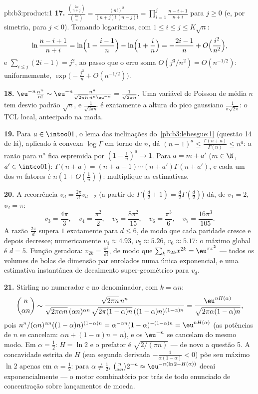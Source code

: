 \begin{solution}{pb:b3:product:1}
\textbf{17.} $\frac{\binom{2n}{n+j}}{\binom{2n}n} =
\frac{(n!)^2}{(n+j)!\,(n-j)!} =
\prod_{i=1}^{j}\frac{n-i+1}{n+i}$ para $j \geq 0$ (e, por
simetria, para $j < 0$). Tomando logaritmos, com $1 \leq i
\leq j \leq K\sqrt n$:
\[
\ln\frac{n-i+1}{n+i} = \ln\Bigl(1 - \frac{i-1}n\Bigr) -
\ln\Bigl(1 + \frac in\Bigr) = -\frac{2i-1}{n} +
O\Bigl(\frac{i^2}{n^2}\Bigr),
\]
e $\sum_{i\leq j}(2i - 1) = j^2$, ao passo que o erro soma
$O(j^3/n^2) = O(n^{-1/2})$: uniformemente,
$\exp\bigl(-\frac{j^2}n + O(n^{-1/2})\bigr)$.

\textbf{18.} $\eu^{-n}\frac{n^n}{n!} \sim \eu^{-n}
\frac{n^n}{\sqrt{2\pi n}\,n^n\eu^{-n}} =
\frac1{\sqrt{2\pi n}}$. Uma variável de Poisson de média $n$ tem
desvio padrão $\sqrt n$, e $\frac1{\sqrt{2\pi n}}$ é
exatamente a altura do pico gaussiano $\frac1{\sigma\sqrt{2\pi}}$:
o TCL local, antecipado na moda.

\textbf{19.} Para $a \in \intoo01$, o lema das inclinações do~\cref{pb:b3:lebesgue:1} (questão 14 de lá), aplicado à
convexa $\log\Gamma$ em torno de $n$, dá $(n-1)^a \leq
\frac{\Gamma(n+a)}{\Gamma(n)} \leq n^a$: a razão para $n^a$
fica espremida por $(1 - \frac1n)^a \to 1$. Para $a = m + a'$
($m \in \N$, $a' \in \intco01$): $\Gamma(n+a) = (n + a - 1)
\cdots(n + a')\Gamma(n + a')$, e cada um dos $m$ fatores é
$n(1 + O(\frac1n))$: multiplique as estimativas.

\textbf{20.} A recorrência $v_d = \frac{2\pi}dv_{d-2}$
(a partir de $\Gamma(\frac d2 + 1) = \frac d2\Gamma(\frac d2)$)
dá, de $v_1 = 2$, $v_2 = \pi$:
\[
v_3 = \frac{4\pi}3,\quad v_4 = \frac{\pi^2}2,\quad
v_5 = \frac{8\pi^2}{15},\quad v_6 = \frac{\pi^3}6,\quad
v_7 = \frac{16\pi^3}{105}.
\]
A razão $\frac{2\pi}d$ supera $1$ exatamente para $d \leq 6$,
de modo que cada paridade cresce e depois decresce; numericamente $v_4
\approx 4.93$, $v_5 \approx 5.26$, $v_6 \approx 5.17$: o
máximo global é $d = 5$. Função geradora: $v_{2k} =
\frac{\pi^k}{k!}$, de modo que $\sum_kv_{2k}x^{2k} =
\eu^{\pi x^2}$ --- todos os volumes de bolas de dimensão par
enrolados numa única exponencial, e uma estimativa instantânea de
decaimento super-geométrico para $v_d$.

\textbf{21.} Stirling no numerador e no denominador, com $k =
\alpha n$:
\[
\binom n{\alpha n} \sim
\frac{\sqrt{2\pi n}\,n^n}
{\sqrt{2\pi\alpha n}\,(\alpha n)^{\alpha n}\,
\sqrt{2\pi(1-\alpha)n}\,((1-\alpha)n)^{(1-\alpha)n}}
= \frac{\eu^{nH(\alpha)}}{\sqrt{2\pi\alpha(1-\alpha)n}},
\]
pois $n^n/(\alpha n)^{\alpha n}((1-\alpha)n)^{(1-\alpha)n} =
\alpha^{-\alpha n}(1-\alpha)^{-(1-\alpha)n} =
\eu^{nH(\alpha)}$ (as potências de $n$ se cancelam: $\alpha n +
(1-\alpha)n = n$), e os $\eu^{-n}$ se cancelam do mesmo modo. Em
$\alpha = \frac12$: $H = \ln2$ e o prefator é
$\sqrt{2/(\pi n)}$ --- de novo a questão 5. A concavidade estrita de
$H$ (sua segunda derivada $-\frac1{\alpha(1-\alpha)} < 0$)
põe seu máximo $\ln 2$ apenas em $\alpha = \frac12$: para
$\alpha \neq \frac12$, $\binom n{\alpha n}2^{-n} \approx
\eu^{-n(\ln2 - H(\alpha))}$ decai exponencialmente --- o
motor combinatório por trás de todo enunciado de concentração
sobre lançamentos de moeda.


\end{solution}
